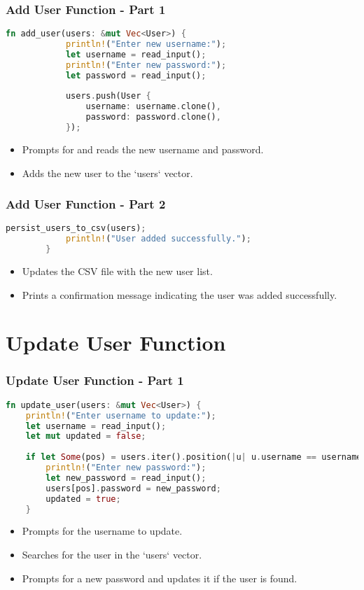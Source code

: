 \documentclass[aspectratio=169, table]{beamer}
\begin{document}
\begin{frame}[fragile]
	\frametitle{Add User Function - Part 1}
	\begin{lstlisting}[language=Rust]
		fn add_user(users: &mut Vec<User>) {
			println!("Enter new username:");
			let username = read_input();
			println!("Enter new password:");
			let password = read_input();
			
			users.push(User {
				username: username.clone(),
				password: password.clone(),
			});
		\end{lstlisting}
		\begin{itemize}
			\item Prompts for and reads the new username and password.
			\item Adds the new user to the `users` vector.
		\end{itemize}
	\end{frame}
	
	\begin{frame}[fragile]
		\frametitle{Add User Function - Part 2}
		\begin{lstlisting}[language=Rust]
			persist_users_to_csv(users);
			println!("User added successfully.");
		}
	\end{lstlisting}
	\begin{itemize}
		\item Updates the CSV file with the new user list.
		\item Prints a confirmation message indicating the user was added successfully.
	\end{itemize}
\end{frame}


\section{Update User Function}

\begin{frame}[fragile]
\frametitle{Update User Function - Part 1}
\vspace{15pt}
\begin{lstlisting}[language=Rust]
fn update_user(users: &mut Vec<User>) {
	println!("Enter username to update:");
	let username = read_input();
	let mut updated = false;
	
	if let Some(pos) = users.iter().position(|u| u.username == username) {
		println!("Enter new password:");
		let new_password = read_input();
		users[pos].password = new_password;
		updated = true;
	}
\end{lstlisting}
\begin{itemize}
	\item Prompts for the username to update.
	\item Searches for the user in the `users` vector.
	\item Prompts for a new password and updates it if the user is found.
\end{itemize}
\end{frame}
\end{document}
